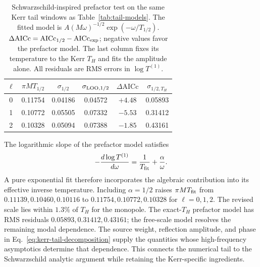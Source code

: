 \documentclass[aps,prd,twocolumn,10pt,nofootinbib,superscriptaddress,floatfix]{revtex4-2}
\begin{document}
\begin{table}[t]
\caption{Schwarzschild-inspired prefactor test on the same Kerr tail
windows as Table~\ref{tab:tail-models}.  The fitted model is
$A(M\omega)^{-1/2}\exp(-\omega/T_{1/2})$.
$\Delta\mathrm{AICc}=\mathrm{AICc}_{1/2}-\mathrm{AICc}_{\rm exp}$;
negative values favor the prefactor model.  The last column fixes its
temperature to the Kerr $T_H$ and fits the amplitude alone.  All residuals
are RMS errors in $\log T^{(1)}$.}
\label{tab:tail-prefactor20261014}
\begin{ruledtabular}
\begin{tabular}{cccccc}
$\ell$ & $\pi MT_{1/2}$ & $\sigma_{1/2}$ &
$\sigma_{\rm LOO,1/2}$ & $\Delta\mathrm{AICc}$ & $\sigma_{1/2,T_H}$\\
\hline
0 & 0.11754 & 0.04186 & 0.04572 & $+4.48$ & 0.05893\\
1 & 0.10772 & 0.05505 & 0.07332 & $-5.53$ & 0.31412\\
2 & 0.10328 & 0.05094 & 0.07388 & $-1.85$ & 0.43161\\
\end{tabular}
\end{ruledtabular}
\end{table}

The logarithmic slope of the prefactor model satisfies
\begin{equation}
-\frac{d\log T^{(1)}}{d\omega}
=\frac{1}{T_{\rm fit}}+\frac{\alpha}{\omega}.
\label{eq:tail-effective-slope}
\end{equation}
A pure exponential fit therefore incorporates the algebraic contribution
into its effective inverse temperature.  Including $\alpha=1/2$ raises
$\pi MT_{\rm fit}$ from $0.11139,0.10460,0.10116$ to
$0.11754,0.10772,0.10328$ for $\ell=0,1,2$.  The revised scale lies within
$1.3\%$ of $T_H$ for the monopole.  The exact-$T_H$ prefactor model has
RMS residuals $0.05893,0.31412,0.43161$; the free-scale model resolves the
remaining modal dependence.  The source weight, reflection amplitude,
and phase in Eq.~\eqref{eq:kerr-tail-decomposition} supply the quantities
whose high-frequency asymptotics determine that dependence.  This connects
the numerical tail to the Schwarzschild analytic argument while retaining
the Kerr-specific ingredients.
\end{document}
